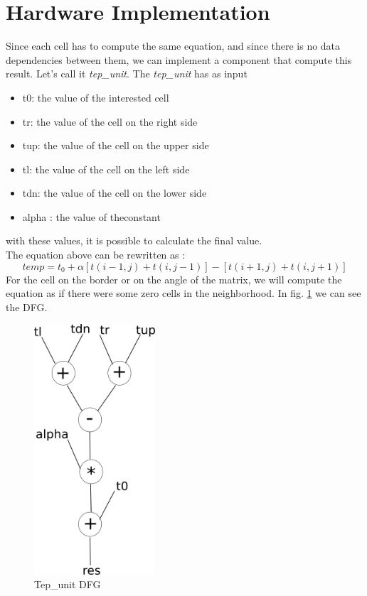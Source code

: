 \section{Hardware Implementation}
Since each cell has to compute the same equation, and since there is no data dependencies between them, we can implement a component that compute this result. Let's call it \textit{tep\_unit}.
The \textit{tep\_unit} has as input
\begin{itemize}
\item t0: the value of the interested cell
\item tr: the value of the cell on the right side
\item tup: the value of the cell on the upper side
\item tl: the value of the cell on the left side
\item tdn: the value of the cell on the lower side
\item alpha : the value of theconstant
\end{itemize}
with these values, it is possible to  calculate the final value.\\
The equation above can be rewritten as :
\begin{equation} \label{tep_eq2}
temp = t_{0}+\alpha{[t(i-1,j)+t(i,j-1)]-[t(i+1,j)+t(i,j + 1)]}
\end{equation}
For the cell on the border or on the angle of the matrix, we will compute the equation as if there were some zero cells in the neighborhood.
In fig. \ref{tep_unit} we can see the DFG.
\begin{figure}[h!]
	\centering
	\includegraphics[width=0.4\textwidth]{imm/tep/tep_unit0.png}  
	\caption{Tep\_unit DFG} 
	\label{tep_unit}
\end{figure}

